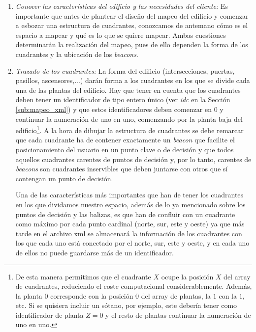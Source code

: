 \begin{enumerate}
	\item \textit{Conocer las características del edificio y las necesidades del cliente:} Es importante que antes de plantear el diseño del mapeo del edificio y comenzar a esbozar una estructura de cuadrantes, conozcamos de antemano cómo es el espacio a mapear y qué es lo que se quiere mapear. Ambas cuestiones determinarán la realización del mapeo, pues de ello dependen la forma de los cuadrantes y la ubicación de los \textit{beacons}. 
	
	\item \textit{Trazado de los cuadrantes:} La forma del edificio (intersecciones, puertas, pasillos, ascensores,...) darán forma a los cuadrantes en los que se divide cada una de las plantas del edificio. Hay que tener en cuenta que los cuadrantes deben tener un identificador de tipo entero único (ver \textit{idc} en la Sección \ref{sub:mapeo_xml}) y que estos identificadores deben comenzar en $0$ y continuar la numeración de uno en uno, comenzando por la planta baja del edificio\footnote{De esta manera permitimos que el cuadrante $X$ ocupe la posición $X$ del array de cuadrantes, reduciendo el coste computacional considerablemente. Además, la planta $0$ corresponde con la posición $0$ del array de plantas, la $1$ con la $1$, etc. Si se quisiera incluir un sótano, por ejemplo, este debería tener como identificador de planta $Z = 0$ y el resto de plantas continuar la numeración de uno en uno.}. A la hora de dibujar la estructura de cuadrantes se debe remarcar que cada cuadrante ha de contener exactamente un \textit{beacon} que facilite el posicionamiento del usuario en un punto clave o de decisión y que todos aquellos cuadrantes carentes de puntos de decisión y, por lo tanto, carentes de \textit{beacons} son cuadrantes inservibles que deben juntarse con otros que sí contengan un punto de decisión.
	
	Una de las características más importantes que han de tener los cuadrantes en los que dividamos nuestro espacio, además de lo ya mencionado sobre los puntos de decisión y las balizas, es que han de confluir con un cuadrante como máximo por cada punto cardinal (norte, sur, este y oeste) ya que más tarde en el archivo xml se almacenará la información de los cuadrantes con los que cada uno está conectado por el norte, sur, este y oeste, y en cada uno de ellos no puede guardarse más de un identificador.
	

\end{enumerate}
